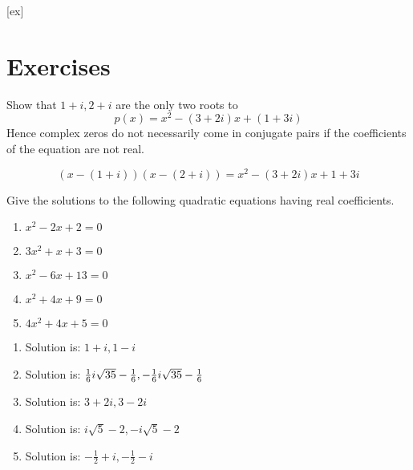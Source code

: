 [ex]
\section*{Exercises}


\begin{ex} Show that $1+i,2+i$ are the only two roots to
\begin{equation*}
p(x) =x^{2}-(3+2i) x+(1+3i)
\end{equation*}
Hence complex zeros do not necessarily come in conjugate pairs if the coefficients of the equation
are not real. 
\begin{sol}
\[
(x-(1+i)) (x-(2+i))
= x^{2}-(3+2i) x+1+3i
\]
\end{sol}
\end{ex}

\begin{ex} Give the solutions to the following quadratic equations having real
coefficients.

\begin{enumerate}
\item $x^{2}-2x+2=0$

\item $3x^{2}+x+3=0$

\item $x^{2}-6x+13=0$

\item $x^{2}+4x+9=0$

\item $4x^{2}+4x+5=0$
\end{enumerate}
\begin{sol}
\begin{enumerate}
\item Solution is: $1+i,1-i$
\item Solution is: $\frac{1}{6}i\sqrt{35}-\frac{1}{6},-\frac{%
1}{6}i\sqrt{35}-\frac{1}{6}$
\item Solution is: $3+2i,3-2i$
\item Solution is: $i\sqrt{5}-2,-i\sqrt{5}-2$
\item Solution is: $-\frac{1}{2}+i,-\frac{1}{2}-i$
\end{enumerate}
\end{sol}
\end{ex}


